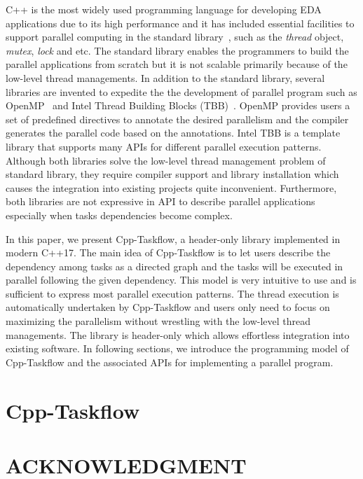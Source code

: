 \documentclass[sigconf]{acmart}
\begin{document}
C++ is the most widely used programming language for developing EDA
applications due to its high performance and it has included essential
facilities to support parallel computing in the standard library~\cite{cpp-thread}, such as the
\textit{thread} object, \textit{mutex}, \textit{lock} and etc.  The standard
library enables the programmers to build the parallel applications from scratch 
but it is not scalable primarily because of the low-level thread managements.
In addition to the standard library, several libraries are invented to expedite the
the development of parallel program such as OpenMP~\cite{openmp} and Intel
Thread Building Blocks (TBB)~\cite{tbb}.  OpenMP provides users a set of
predefined directives to annotate the desired parallelism and the compiler generates
the parallel code based on the annotations. Intel TBB is a template library that supports 
many APIs for different parallel execution patterns. Although both libraries 
solve the low-level thread management problem of standard library, they require
compiler support and library installation which causes the integration
into existing projects quite inconvenient. Furthermore, both libraries 
are not expressive in API to describe parallel applications especially
when tasks dependencies become complex.

In this paper, we present Cpp-Taskflow, a header-only library implemented in 
modern C++17. The main idea of Cpp-Taskflow is to let users describe the 
dependency among tasks as a directed graph and the tasks will be executed in
parallel following the given dependency. This model is very intuitive to use
and is sufficient to express most parallel execution patterns. 
The thread execution is automatically undertaken by Cpp-Taskflow and users only need to
focus on maximizing the parallelism without wrestling with the low-level thread
managements. The library is header-only which allows effortless integration
into existing software.  In following sections, we introduce the programming
model of Cpp-Taskflow and the associated APIs for implementing a parallel
program.


\section{Cpp-Taskflow}



\section{ACKNOWLEDGMENT}




%
%


\end{document}
